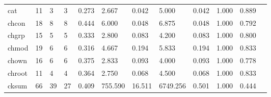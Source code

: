 \begin{longtable}{lp{1.00cm}p{1.00cm}p{1.00cm}p{1.00cm}p{1.00cm}p{1.00cm}p{1.00cm}p{1.00cm}p{1.00cm}p{1.00cm}p{1.00cm}}
cat       &                           11 &                  3 &                                 3 &                                      0.273 &                                  2.667 &                                        0.042 &                             5.000 &                                   0.042 &                        1.000 &                                        0.889 \\
chcon     &                           18 &                  8 &                                 8 &                                      0.444 &                                  6.000 &                                        0.048 &                             6.875 &                                   0.048 &                        1.000 &                                        0.792 \\
chgrp     &                           15 &                  5 &                                 5 &                                      0.333 &                                  2.800 &                                        0.083 &                             4.200 &                                   0.083 &                        1.000 &                                        0.800 \\
chmod     &                           19 &                  6 &                                 6 &                                      0.316 &                                  4.667 &                                        0.194 &                             5.833 &                                   0.194 &                        1.000 &                                        0.833 \\
chown     &                           16 &                  6 &                                 6 &                                      0.375 &                                  2.833 &                                        0.093 &                             4.000 &                                   0.093 &                        1.000 &                                        0.778 \\
chroot    &                           11 &                  4 &                                 4 &                                      0.364 &                                  2.750 &                                        0.068 &                             4.500 &                                   0.068 &                        1.000 &                                        0.833 \\
cksum     &                           66 &                 39 &                                27 &                                      0.409 &                                755.590 &                                       16.511 &                          6749.256 &                                   0.501 &                        1.000 &                                        0.444 \\

\end{longtable}

